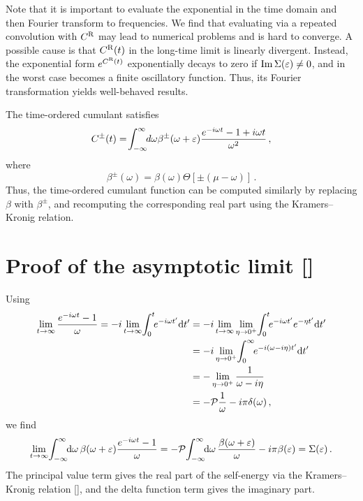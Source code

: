 \documentclass[
    reprint, onecolumn,
    aps,prx,11pt,tightenlines,amsmath,amssymb,
    longbibliography,superscriptaddress,citeautoscript,
    preprintnumbers,nofootinbib]{revtex4-2}
\begin{document}
Note that it is important to evaluate the exponential in the time domain and then Fourier transform to frequencies.
%
We find that evaluating  via a repeated convolution with $C^{\rm R}$ may lead to numerical problems and is hard to converge.
%
A possible cause is that $C^{\rm R}(t)$ in the long-time limit is linearly divergent.
%
Instead, the exponential form $e^{C^{\rm R}(t)}$ exponentially decays to zero if $\operatorname{Im} \Sigma(\varepsilon) \neq 0$, and in the worst case becomes a finite oscillatory function.
%
Thus, its Fourier transformation yields well-behaved results.


\medskip
The time-ordered cumulant satisfies
\begin{equation}
    C^{\rm \pm}(t) = \!\int_{-\infty}^{\infty}\!\! d\omega \beta^\pm(\omega + \varepsilon) \frac{e^{-i\omega t} - 1 + i\omega t}{\omega^2} \,,
\end{equation}
where
\begin{equation}
    \beta^\pm(\omega) = \beta(\omega)\Theta[\pm(\mu - \omega)] \,.
\end{equation}
Thus, the time-ordered cumulant function can be computed similarly by replacing $\beta$ with $\beta^\pm$, and recomputing the corresponding real part using the Kramers--Kronig relation.



\appendix
\section{Proof of the asymptotic limit []} \label{app:proof}
Using
\begin{align}
    \lim_{t \to \infty} \frac{e^{-i\omega t} - 1}{\omega}
    = -i \lim_{t \to \infty} \nbint{0}{t} e^{-i\omega t'} \dd t'
    &= -i \lim_{t \to \infty} \lim_{\eta \to 0^+} \nbint{0}{t} e^{-i\omega t'} e^{-\eta t'} \dd t'
    \nnnl
    &= -i \lim_{\eta \to 0^+} \nbint{0}{\infty} e^{-i(\omega - i\eta) t'} \dd t'
    \nnnl
    &= - \lim_{\eta \to 0^+} \frac{1}{\omega - i\eta}
    \nnnl
    &= -\mc{P} \frac{1}{\omega} - i\pi\delta(\omega) \,,
\end{align}
we find
\begin{equation}
    \lim_{t \to \infty} \!\int_{-\infty}^{\infty}\!\! {\mathrm{d}}\omega \, \beta(\omega + \varepsilon) \frac{e^{-i\omega t} - 1}{\omega}
    = -{\mathcal{P}} \!\int_{-\infty}^{\infty}\!\! {\mathrm{d}}\omega \, \frac{\beta(\omega + \varepsilon)}{\omega}
    -i \pi \beta(\varepsilon)
    = \Sigma(\varepsilon) \,.
\end{equation}
The principal value term gives the real part of the self-energy via the Kramers--Kronig relation [], and the delta function term gives the imaginary part.
\end{document}
